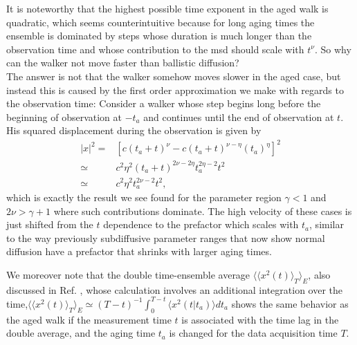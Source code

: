 It is noteworthy that the highest possible time exponent in the aged walk is quadratic, which seems counterintuitive because for long aging times the ensemble is dominated by steps whose duration is much longer than the observation time and whose contribution to the \gls{msd} should scale with $t^{\nu}$. So why can the walker not move faster than ballistic diffusion? \\
The answer is not that the walker somehow moves slower in the aged case, but instead this is caused by the first order approximation we make with regards to the observation time: Consider a walker whose step begins long before the beginning of observation at $-t_a$ and continues until the end of observation at $t$. His squared displacement during the observation is given by
%
\begin{align}
|x|^2 =& [c (t_a+t)^{\nu} - c (t_a+t)^{\nu-\eta} (t_a)^{\eta} ]^2\\
\simeq & c^2 \eta^2  (t_a+t)^{2\nu-2\eta} t_a^{2 \eta -2} t^2 \\
\simeq & c^2 \eta^2 t_a^{2 \nu -2} t^2 ,
\end{align}
%
which is exactly the result we see found for the parameter region $\gamma <1$ and $2\nu > \gamma+1$ where such contributions dominate. The high velocity of these cases is just shifted from the $t$ dependence to the prefactor which scales with $t_a$, similar to the way previously subdiffusive parameter ranges that now show normal diffusion have a prefactor that shrinks with larger aging times.

We moreover note that the double time-ensemble average $\langle \langle x^2 (t) \rangle_T \rangle_E$, also discussed in Ref. 
\cite{radons2018}, 
whose calculation involves an additional integration over the time,$\langle \langle x^2 (t) \rangle_T \rangle_E \simeq (T-t)^{-1} \int_0^{T-t} \langle x^2 (t|t_a) \rangle dt_a$  shows the same behavior as the aged walk if the measurement time $t$ is associated with the time lag in the double average, and the aging time $t_a$ is changed for the data acquisition time $T$.   


